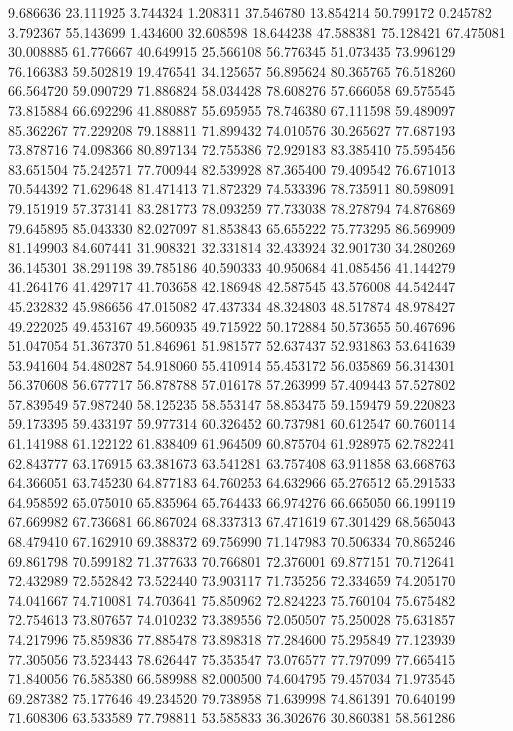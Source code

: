 9.686636
23.111925
3.744324
1.208311
37.546780
13.854214
50.799172
0.245782
3.792367
55.143699
1.434600
32.608598
18.644238
47.588381
75.128421
67.475081
30.008885
61.776667
40.649915
25.566108
56.776345
51.073435
73.996129
76.166383
59.502819
19.476541
34.125657
56.895624
80.365765
76.518260
66.564720
59.090729
71.886824
58.034428
78.608276
57.666058
69.575545
73.815884
66.692296
41.880887
55.695955
78.746380
67.111598
59.489097
85.362267
77.229208
79.188811
71.899432
74.010576
30.265627
77.687193
73.878716
74.098366
80.897134
72.755386
72.929183
83.385410
75.595456
83.651504
75.242571
77.700944
82.539928
87.365400
79.409542
76.671013
70.544392
71.629648
81.471413
71.872329
74.533396
78.735911
80.598091
79.151919
57.373141
83.281773
78.093259
77.733038
78.278794
74.876869
79.645895
85.043330
82.027097
81.853843
65.655222
75.773295
86.569909
81.149903
84.607441
31.908321
32.331814
32.433924
32.901730
34.280269
36.145301
38.291198
39.785186
40.590333
40.950684
41.085456
41.144279
41.264176
41.429717
41.703658
42.186948
42.587545
43.576008
44.542447
45.232832
45.986656
47.015082
47.437334
48.324803
48.517874
48.978427
49.222025
49.453167
49.560935
49.715922
50.172884
50.573655
50.467696
51.047054
51.367370
51.846961
51.981577
52.637437
52.931863
53.641639
53.941604
54.480287
54.918060
55.410914
55.453172
56.035869
56.314301
56.370608
56.677717
56.878788
57.016178
57.263999
57.409443
57.527802
57.839549
57.987240
58.125235
58.553147
58.853475
59.159479
59.220823
59.173395
59.433197
59.977314
60.326452
60.737981
60.612547
60.760114
61.141988
61.122122
61.838409
61.964509
60.875704
61.928975
62.782241
62.843777
63.176915
63.381673
63.541281
63.757408
63.911858
63.668763
64.366051
63.745230
64.877183
64.760253
64.632966
65.276512
65.291533
64.958592
65.075010
65.835964
65.764433
66.974276
66.665050
66.199119
67.669982
67.736681
66.867024
68.337313
67.471619
67.301429
68.565043
68.479410
67.162910
69.388372
69.756990
71.147983
70.506334
70.865246
69.861798
70.599182
71.377633
70.766801
72.376001
69.877151
70.712641
72.432989
72.552842
73.522440
73.903117
71.735256
72.334659
74.205170
74.041667
74.710081
74.703641
75.850962
72.824223
75.760104
75.675482
72.754613
73.807657
74.010232
73.389556
72.050507
75.250028
75.631857
74.217996
75.859836
77.885478
73.898318
77.284600
75.295849
77.123939
77.305056
73.523443
78.626447
75.353547
73.076577
77.797099
77.665415
71.840056
76.585380
66.589988
82.000500
74.604795
79.457034
71.973545
69.287382
75.177646
49.234520
79.738958
71.639998
74.861391
70.640199
71.608306
63.533589
77.798811
53.585833
36.302676
30.860381
58.561286
